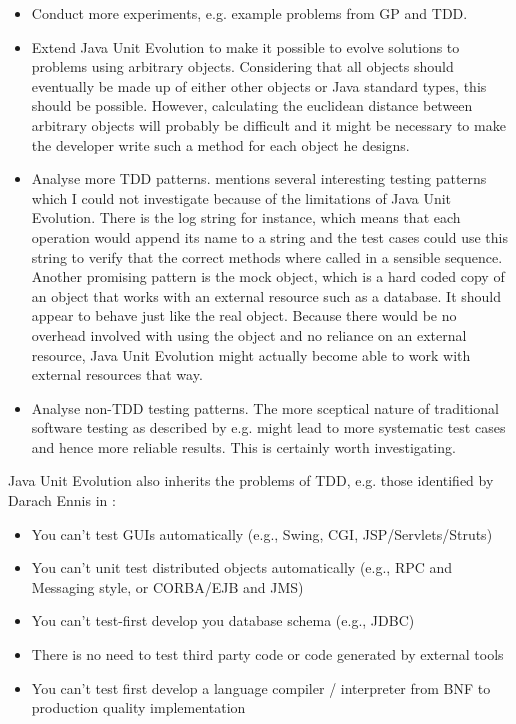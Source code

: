 \documentclass[a4paper]{article}
\begin{document}
\begin{itemize}
\item Conduct more experiments, e.g. example problems from GP and TDD.
\item Extend Java Unit Evolution to make it possible to evolve
  solutions to problems using arbitrary objects. Considering that all
  objects should eventually be made up of either other objects or Java
  standard types, this should be possible. However, calculating the
  euclidean distance between arbitrary objects will probably be
  difficult and it might be necessary to make the developer write such
  a method for each object he designs.
\item Analyse more TDD patterns. \cite{beck2002} mentions several
  interesting testing patterns which I could not investigate because
  of the limitations of Java Unit Evolution. There is the log string
  for instance, which means that each operation would append its name
  to a string and the test cases could use this string to verify that
  the correct methods where called in a sensible sequence. Another
  promising pattern is the mock object, which is a hard coded copy of
  an object that works with an external resource such as a
  database. It should appear to behave just like the real
  object. Because there would be no overhead involved with using the
  object and no reliance on an external resource, Java Unit Evolution
  might actually become able to work with external resources that way.
\item Analyse non-TDD testing patterns. The more sceptical nature of
  traditional software testing as described by e.g. \cite{binder1999}
  might lead to more systematic test cases and hence more reliable
  results. This is certainly worth investigating.
\end{itemize}

Java Unit Evolution also inherits the problems of TDD, e.g. those
identified by Darach Ennis in \cite{beck2002}:

\begin{itemize}
\item You can't test GUIs automatically (e.g., Swing, CGI, JSP/Servlets/Struts)
\item You can't unit test distributed objects automatically (e.g., RPC
  and Messaging style, or CORBA/EJB and JMS)
\item You can't test-first develop you database schema (e.g., JDBC)
\item There is no need to test third party code or code generated by
  external tools
\item You can't test first develop a language compiler / interpreter
  from BNF to production quality implementation
\end{itemize}
\end{document}
